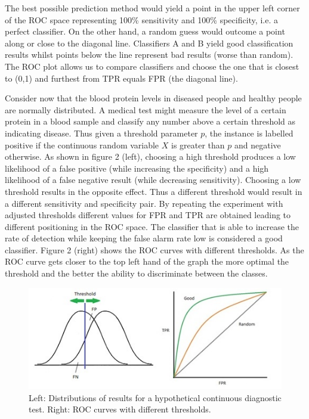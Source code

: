 \documentclass[a4paper,justified]{tufte-handout}
\begin{document}
\vspace{3mm}
\noindent The best possible prediction method would yield a point in the upper left corner of the ROC space representing 100\% sensitivity and 100\% specificity, i.e. a perfect classifier. On the other hand, a random guess would outcome a point along or close to the diagonal line. Classifiers A and B yield good classification results whilst points below the line represent bad results (worse than random). The ROC plot allows us to compare classifiers and choose the one that is closest to (0,1) and furthest from TPR equals FPR (the diagonal line).

\begin{fullwidth}
\vspace{3mm}
\noindent Consider now that the blood protein levels in diseased people and healthy people are normally distributed. A medical test might measure the level of a certain protein in a blood sample and classify any number above a certain threshold as indicating disease. Thus given a threshold parameter $p$, the instance is labelled positive if the continuous random variable $X$ is greater than $p$ and negative otherwise. As shown in figure 2 (left), choosing a high threshold produces a low likelihood of a false positive (while increasing the specificity) and a high likelihood of a false negative result (while decreasing sensitivity). Choosing a low threshold results in the opposite effect. Thus a different threshold would result in a different sensitivity and specificity pair. By repeating the experiment with adjusted thresholds different values for FPR and TPR are obtained leading to different positioning in the ROC space. The classifier that is able to increase the rate of detection while keeping the false alarm rate low is considered a good classifier. Figure 2 (right) shows the ROC curves with different thresholds. As the ROC curve gets closer to the top left hand of the graph the more optimal the threshold and the better the ability to discriminate between the classes.
\end{fullwidth}

\begin{figure}
	\includegraphics[width=\linewidth]{roc_curves/Figure2.png}
	\caption{Left: Distributions of results for a hypothetical continuous diagnostic test. Right: ROC curves with different thresholds.}
	\label{fig:fullfig}
\end{figure}
\end{document}
